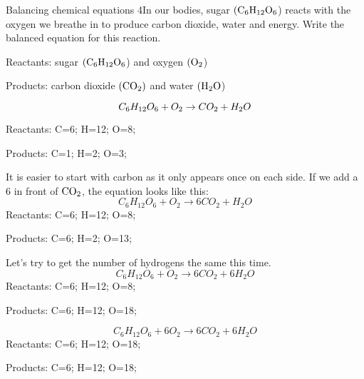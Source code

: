 \begin{wex}{Balancing chemical equations 4}{In our bodies, sugar $\rm{(C_{6}H_{12}O_{6}}$) reacts with the oxygen we breathe in to produce carbon dioxide, water and energy. Write the balanced equation for this reaction.\\}

{
Reactants: sugar $\rm{(C_{6}H_{12}O_{6}}$) and oxygen $\rm{( O_{2}}$)

Products: carbon dioxide $\rm{(CO_{2})}$ and water $\rm{(H_{2}O}$)\\
}
{
    \begin{equation*}
    C_{6}H_{12}O_{6} + O_{2} \rightarrow CO_{2} + H_{2}O\\
    \end{equation*}
}
{
   Reactants: C=6; H=12; O=8;

   Products: C=1; H=2; O=3;\\
}
{
   It is easier to start with carbon as it only appears once on each side. If we add a 6 in front of $\rm{CO_{2}}$, the equation looks like this:
    \begin{equation*}
    C_{6}H_{12}O_{6} + O_{2} \rightarrow 6CO_{2} + H_{2}O
    \end{equation*}
   Reactants: C=6; H=12; O=8;

   Products: C=6; H=2; O=13;\\
}
{
Let's try to get the number of hydrogens the same this time.
   \begin{equation*}
    C_{6}H_{12}O_{6} + O_{2} \rightarrow 6CO_{2} + 6H_{2}O
    \end{equation*}
   Reactants: C=6; H=12; O=8;

   Products: C=6; H=12; O=18;\\
}
{
   \begin{equation*}
    C_{6}H_{12}O_{6} + 6O_{2} \rightarrow 6CO_{2} + 6H_{2}O
    \end{equation*}
   Reactants: C=6; H=12; O=18;

   Products: C=6; H=12; O=18;\\
}
\end{wex}

